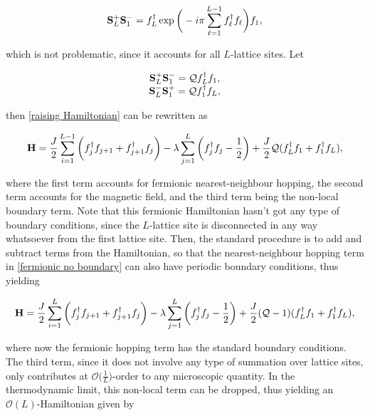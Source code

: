 \documentclass{homework}
\begin{document}
\begin{equation*}
    {\bf S}_{L}^{+} {\bf S}_{1}^{-} = f_L^\dagger \exp\bigg(-i\pi \sum_{\ell = 1}^{L-1} f_\ell^\dagger f_\ell \bigg) f_1,
\end{equation*}

which is not problematic, since it accounts for all $L$-lattice sites. Let

\begin{equation}
    \begin{array}{c}
       {\bf S}_{L}^{+} {\bf S}_{1}^{-} = \mathcal{Q} f_L^\dagger f_1, \\
       {\bf S}_{L}^{-} {\bf S}_{1}^{+} = \mathcal{Q} f_1^\dagger f_L,
    \end{array}
\end{equation}

then \eqref{raising Hamiltonian} can be rewritten as 

\begin{equation}
    {\bf H} = \frac{J}{2} \sum_{i=1}^{L-1} \bigg(f_{j}^{\dagger} f_{j+1} + f_{j+1}^{\dagger} f_j\bigg) - \lambda \sum_{j=1}^{L} \bigg(f_{j}^{\dagger} f_{j} - \frac{1}{2}\bigg) + \frac{J}{2} \mathcal{Q} (f_L^\dagger f_1 + f_1^\dagger f_L),
    \label{fermionic no boundary}
\end{equation}

where the first term accounts for fermionic nearest-neighbour hopping, the second term accounts for the magnetic field, and the third term being the non-local boundary term. Note that this fermionic Hamiltonian hasn't got any type of boundary conditions, since the $L$-lattice site is disconnected in any way whatsoever from the first lattice site. Then, the standard procedure is to add and subtract terms from the Hamiltonian, so that the nearest-neighbour hopping term in \eqref{fermionic no boundary} can also have periodic boundary conditions, thus yielding 

\begin{equation}
    {\bf H} = \frac{J}{2} \sum_{i=1}^{L} \bigg(f_{j}^{\dagger} f_{j+1} + f_{j+1}^{\dagger} f_j\bigg) - \lambda \sum_{j=1}^{L} \bigg(f_{j}^{\dagger} f_{j} - \frac{1}{2}\bigg) + \frac{J}{2} (\mathcal{Q}-1) (f_L^\dagger f_1 + f_1^\dagger f_L),
    \label{true fermionic hamiltonian}
\end{equation}

where now the fermionic hopping term has the standard boundary conditions. The third term, since it does not involve any type of summation over lattice sites, only contributes at $\mathcal{O}\bigg(\frac{1}{L}\bigg)$-order to any microscopic quantity. In the thermodynamic limit, this non-local term can be dropped, thus yielding an $\mathcal{O}(L)$-Hamiltonian given by 
\end{document}
